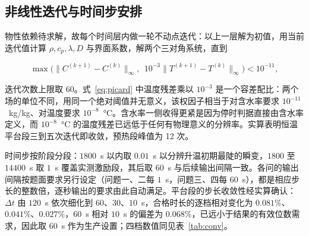 \subsection{非线性迭代与时间步安排}

物性依赖待求解，故每个时间层内做一轮不动点迭代：以上一层解为初值，用当前迭代值计算 $\rho,c_p,\lambda,D$ 与界面系数，解两个三对角系统，直到

\begin{equation}
\max\!\Big(\big\|C^{(k+1)}-C^{(k)}\big\|_\infty,\ \ 10^{-3}\big\|T^{(k+1)}-T^{(k)}\big\|_\infty\Big)<10^{-11},
\label{eq:picard}
\end{equation}

迭代次数上限取 60。式~\eqref{eq:picard} 中温度残差乘以 $10^{-3}$ 是一个容差配比：两个场的单位不同，用同一个绝对阈值并无意义，该权因子相当于对含水率要求 $10^{-11}$~kg/kg、对温度要求 $10^{-8}$~°C。含水率一侧收得更紧是因为停时判据直接由含水率定义，而 $10^{-8}$~°C 的温度残差已远低于任何有物理意义的分辨率。实算表明恒温平台段三到五次迭代即收敛，预热段峰值为 12 次。

时间步按阶段分段：$1800$~s 以内取 $0.01$~s 以分辨升温初期最陡的瞬变，$1800$ 至 $14400$~s 取 $1$~s 覆盖实测激励段，其后取 $60$~s 与后续输出间隔一致。各问的输出间隔按题面要求另行设定（问题一、二每 $1$~s，问题三、四每 $60$~s），都是相应步长的整数倍，逐秒输出的要求由此自动满足。平台段的步长收敛性经实算确认：$\Delta t$ 由 $120$~s 依次细化到 $60$、$30$、$10$~s，合格时长的逐档相对变化为 $0.081\%$、$0.041\%$、$0.027\%$，$60$~s 相对 $10$~s 的偏差为 $0.068\%$，已远小于结果的有效位数需求，因此取 $60$~s 作为生产设置；四档数值同见表~\ref{tab:conv}。
